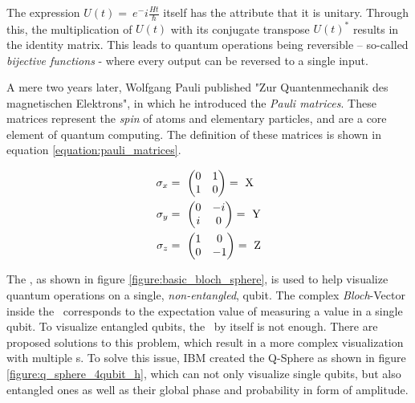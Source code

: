 The expression $U(t) =\ e^-i\frac{Ht}{\hbar}$ itself has the attribute that it is unitary. Through this, the multiplication of $U(t)$ with its conjugate transpose $U(t)^\ast$ results in the identity matrix. This leads to quantum operations being reversible – so-called \emph{bijective functions} - where every output can be reversed to a single input. \par
A mere two years later, Wolfgang Pauli published "Zur Quantenmechanik des magnetischen Elektrons"\cite{pauli_zur_1927}, in which he introduced the \emph{Pauli matrices}. These matrices represent the \emph{spin} of atoms and elementary particles, and are a core element of quantum computing. The definition of these matrices is shown in equation \ref{equation:pauli_matrices}.

\begin{equation}
    \centering
    \begin{split}
        \sigma_x &=\ \begin{pmatrix}0 & 1 \\ 1 & 0\end{pmatrix} =\ \mathrm{X}\\
        \sigma_y &=\ \begin{pmatrix}0 & -i \\ i & 0\end{pmatrix} =\ \mathrm{Y}\\
        \sigma_z &=\ \begin{pmatrix}1 & 0 \\ 0 & -1\end{pmatrix} =\ \mathrm{Z}\\
    \end{split}
    \label{equation:pauli_matrices}
\end{equation}

\newpage

The \bloch\cite{michael_a_nielsen_quantum_2000}, as shown in figure \ref{figure:basic_bloch_sphere}, is used to help visualize quantum operations on a single, \emph{non-entangled}, qubit. The complex \emph{Bloch}-Vector inside the \bloch\ corresponds to the expectation value of measuring a value in a single qubit. To visualize entangled qubits, the \bloch\ by itself is not enough. There are proposed solutions to this problem\cite{gamel_entangled_2016}, which result in a more complex visualization with multiple \bloch s. To solve this issue, IBM created the Q-Sphere\cite{ibm_quantum_visualizations_nodate} as shown in figure \ref{figure:q_sphere_4qubit_h}, which can not only visualize single qubits, but also entangled ones as well as their global phase and probability in form of amplitude.

